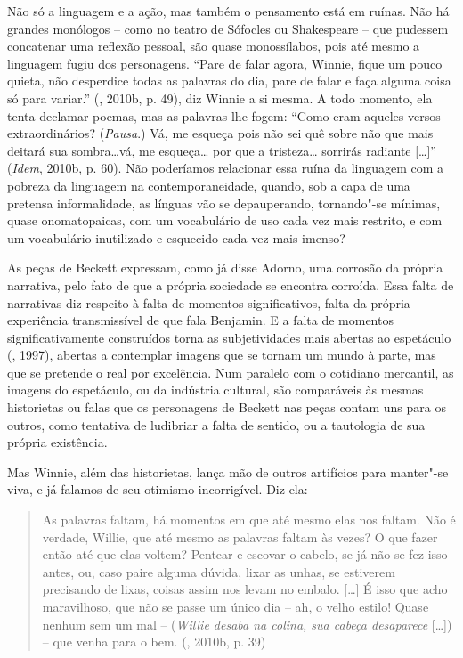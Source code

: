 {Não só a linguagem e a ação, mas também o pensamento está em ruínas. Não
há grandes monólogos -- como no teatro de Sófocles ou Shakespeare -- que
pudessem concatenar uma reflexão pessoal, são quase monossílabos, pois
até mesmo a linguagem fugiu dos personagens. ``Pare de falar agora,
Winnie, fique um pouco quieta, não desperdice todas as palavras do dia,
pare de falar e faça alguma coisa só para variar.'' (, 2010b, p.
49), diz Winnie a si mesma. A todo momento, ela tenta declamar poemas,
mas as palavras lhe fogem: ``Como eram aqueles versos extraordinários?
(\emph{Pausa}.) Vá, me esqueça pois não sei quê sobre não que mais
deitará sua sombra\ldots{}vá, me esqueça\ldots{} por que a tristeza\ldots{} sorrirás
radiante [\ldots{}]'' (\emph{Idem}, 2010b, p. 60). Não poderíamos
relacionar essa ruína da linguagem com a pobreza da linguagem na
contemporaneidade, quando, sob a capa de uma pretensa informalidade, as
línguas vão se depauperando, tornando"-se mínimas, quase onomatopaicas,
com um vocabulário de uso cada vez mais restrito, e com um vocabulário
inutilizado e esquecido cada vez mais imenso?

As peças de Beckett expressam, como já disse Adorno, uma corrosão da
própria narrativa, pelo fato de que a própria sociedade se encontra
corroída. Essa falta de narrativas diz respeito à falta de momentos
significativos, falta da própria experiência transmissível de que fala
Benjamin. E a falta de momentos significativamente construídos torna as
subjetividades mais abertas ao espetáculo (, 1997), abertas a
contemplar imagens que se tornam um mundo à parte, mas que se pretende o
real por excelência. Num paralelo com o cotidiano mercantil, as imagens
do espetáculo, ou da indústria cultural, são comparáveis às mesmas
historietas ou falas que os personagens de Beckett nas peças contam uns
para os outros, como tentativa de ludibriar a falta de sentido, ou a
tautologia de sua própria existência.

Mas Winnie, além das historietas, lança mão de outros artifícios para
manter"-se viva, e já falamos de seu otimismo incorrigível. Diz ela:

\begin{quote}
As palavras faltam, há momentos em que até mesmo elas nos faltam. Não é
verdade, Willie, que até mesmo as palavras faltam às vezes? O que fazer
então até que elas voltem? Pentear e escovar o cabelo, se já não se fez
isso antes, ou, caso paire alguma dúvida, lixar as unhas, se estiverem
precisando de lixas, coisas assim nos levam no embalo. [\ldots{}] É
isso que acho maravilhoso, que não se passe um único dia -- ah, o velho
estilo! Quase nenhum sem um mal -- (\emph{Willie desaba na colina, sua
cabeça desaparece} [\ldots{}]) -- que venha para o bem. (,
2010b, p. 39)
\end{quote}

}
